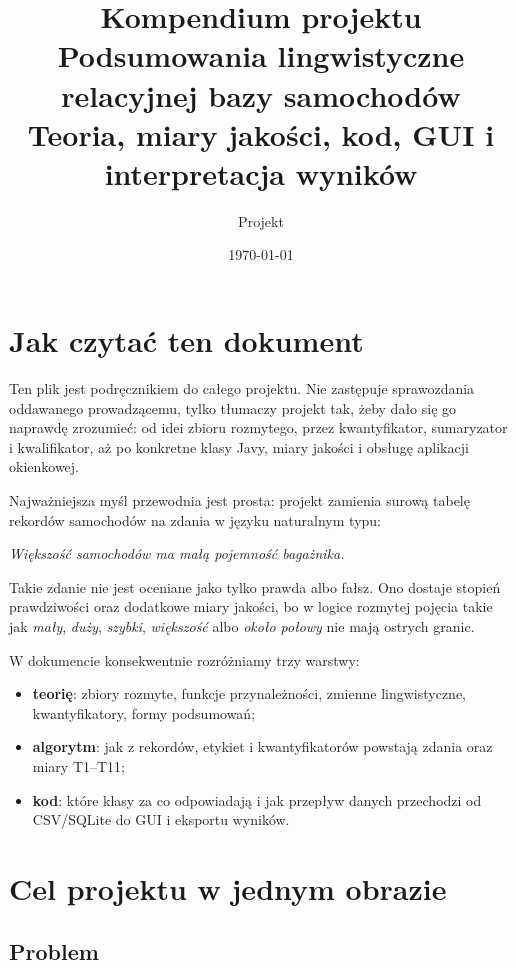 \documentclass[11pt,a4paper]{article}
\title{\Huge Kompendium projektu\\[3mm]
\Large Podsumowania lingwistyczne relacyjnej bazy samochodów\\[2mm]
\large Teoria, miary jakości, kod, GUI i interpretacja wyników}
\author{Projekt \code{linguistic-summaries}}
\date{\today}
\newcommand{\term}[1]{\textbf{#1}}
\begin{document}
\maketitle
\tableofcontents
\newpage

\section*{Jak czytać ten dokument}

Ten plik jest podręcznikiem do całego projektu. Nie zastępuje sprawozdania oddawanego prowadzącemu, tylko tłumaczy projekt tak, żeby dało się go naprawdę zrozumieć: od idei zbioru rozmytego, przez kwantyfikator, sumaryzator i kwalifikator, aż po konkretne klasy Javy, miary jakości i obsługę aplikacji okienkowej.

Najważniejsza myśl przewodnia jest prosta: projekt zamienia surową tabelę rekordów samochodów na zdania w języku naturalnym typu:

\begin{center}
\emph{Większość samochodów ma małą pojemność bagażnika.}
\end{center}

Takie zdanie nie jest oceniane jako tylko prawda albo fałsz. Ono dostaje stopień prawdziwości oraz dodatkowe miary jakości, bo w logice rozmytej pojęcia takie jak \emph{mały}, \emph{duży}, \emph{szybki}, \emph{większość} albo \emph{około połowy} nie mają ostrych granic.

W dokumencie konsekwentnie rozróżniamy trzy warstwy:

\begin{itemize}
    \item \term{teorię}: zbiory rozmyte, funkcje przynależności, zmienne lingwistyczne, kwantyfikatory, formy podsumowań;
    \item \term{algorytm}: jak z rekordów, etykiet i kwantyfikatorów powstają zdania oraz miary T1--T11;
    \item \term{kod}: które klasy za co odpowiadają i jak przepływ danych przechodzi od CSV/SQLite do GUI i eksportu wyników.
\end{itemize}

\section{Cel projektu w jednym obrazie}

\subsection{Problem}
\end{document}
